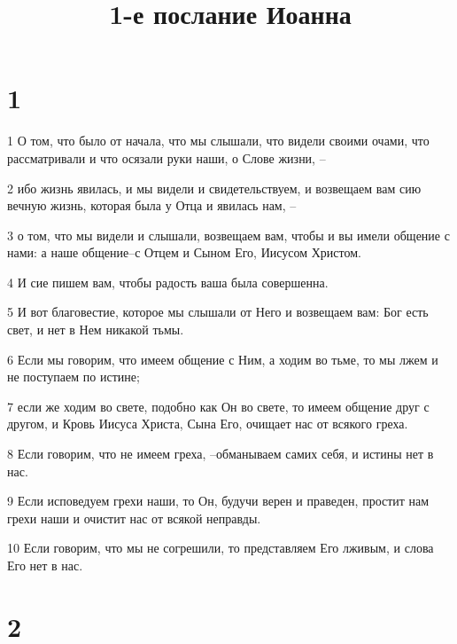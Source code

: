 

\title{1-е послание Иоанна}


\chapter{1}

\par 1 О том, что было от начала, что мы слышали, что видели своими очами, что рассматривали и что осязали руки наши, о Слове жизни, --
\par 2 ибо жизнь явилась, и мы видели и свидетельствуем, и возвещаем вам сию вечную жизнь, которая была у Отца и явилась нам, --
\par 3 о том, что мы видели и слышали, возвещаем вам, чтобы и вы имели общение с нами: а наше общение--с Отцем и Сыном Его, Иисусом Христом.
\par 4 И сие пишем вам, чтобы радость ваша была совершенна.
\par 5 И вот благовестие, которое мы слышали от Него и возвещаем вам: Бог есть свет, и нет в Нем никакой тьмы.
\par 6 Если мы говорим, что имеем общение с Ним, а ходим во тьме, то мы лжем и не поступаем по истине;
\par 7 если же ходим во свете, подобно как Он во свете, то имеем общение друг с другом, и Кровь Иисуса Христа, Сына Его, очищает нас от всякого греха.
\par 8 Если говорим, что не имеем греха, --обманываем самих себя, и истины нет в нас.
\par 9 Если исповедуем грехи наши, то Он, будучи верен и праведен, простит нам грехи наши и очистит нас от всякой неправды.
\par 10 Если говорим, что мы не согрешили, то представляем Его лживым, и слова Его нет в нас.

\chapter{2}

